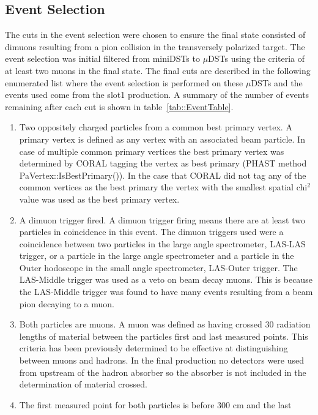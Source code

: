 \subsection{Event Selection}
The cuts in the event selection were chosen to ensure the final state consisted
of dimuons resulting from a pion collision in the transversely polarized target.
The event selection was initial filtered from miniDSTs to $\mu$DSTs using the
criteria of at least two muons in the final state.  The final cuts are described
in the following enumerated list where the event selection is performed on these
$\mu$DSTs and the events used come from the slot1 production.  A summary of the
number of events remaining after each cut is shown in
table~\ref{tab::EventTable}.

\begin{enumerate}
  \label{tab::cutdescrip}
\item Two oppositely charged particles from a common best primary vertex.  A
  primary vertex is defined as any vertex with an associated beam particle.  In
  case of multiple common primary vertices the best primary vertex was
  determined by CORAL tagging the vertex as best primary (PHAST method
  PaVertex::IsBestPrimary()).  In the case that CORAL did not tag any of the
  common vertices as the best primary the vertex with the smallest spatial
  chi$^2$ value was used as the best primary vertex.
\item A dimuon trigger fired.  A dimuon trigger firing means there are at least
  two particles in coincidence in this event. The dimuon triggers used were a
  coincidence between two particles in the large angle spectrometer, LAS-LAS
  trigger, or a particle in the large angle spectrometer and a particle in the
  Outer hodoscope in the small angle spectrometer, LAS-Outer trigger.  The
  LAS-Middle trigger was used as a veto on beam decay muons.  This is because
  the LAS-Middle trigger was found to have many events resulting from a beam
  pion decaying to a muon.
\item Both particles are muons.  A muon was defined as having crossed 30
  radiation lengths of material between the particles first and last measured
  points.  This criteria has been previously determined to be effective at
  distinguishing between muons and hadrons.  In the final production no
  detectors were used from upstream of the hadron absorber so the absorber is
  not included in the determination of material crossed.
\item The first measured point for both particles is before 300 cm and the last

\end{enumerate}
